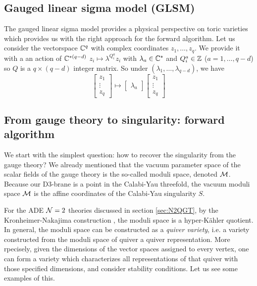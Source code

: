     \subsection{Gauged linear sigma model (GLSM)}

        The gauged linear sigma model provides a physical perspective on toric varieties which provides us with the right approach for the forward algorithm. Let us consider the vectorspace $\mathbb{C}^q$ with complex coordinates $z_1,\dots,z_q$. We provide it with a an action of $\mathbb{C}^{*(q-d)}$ $z_i\mapsto\lambda^{Q^a_i}z_i$ with $\lambda_a\in\mathbb{C}^*$ and $Q^a_i\in\mathbb{Z}$ ($a=1,\dots,q-d$) so $Q$ is a $q\times(q-d)$ integer matrix. So under $(\lambda_1,\dots,\lambda_{q-d})$, we have
        \begin{equation}
            \begin{bmatrix}
                z_1\\
                \vdots\\
                z_q
            \end{bmatrix}
            \mapsto
            \begin{bmatrix}
                \lambda_a
            \end{bmatrix}
            \begin{bmatrix}
                z_1\\
                \vdots\\
                z_q
            \end{bmatrix}
        \end{equation}

    \subsection{From gauge theory to singularity: forward algorithm}

        We start with the simplest question: how to recover the singularity from the gauge theory? We already mentioned that the vacuum parameter space of the scalar fields of the gauge theory is the so-called moduli space, denoted $\mathcal{M}$. Because our D$3$-brane is a point in the Calabi-Yau threefold, the vacuum moduli space $\mathcal{M}$ is the affine coordinates of the Calabi-Yau singularity $S$.

        For the ADE $\mathcal{N}=2$ theories discussed in section \ref{sec:N2QGT}, by the Kronheimer-Nakajima construction \cite{Kronheimer1990}, the moduli space is a hyper-Kähler quotient. In general, the moduli space can be constructed as a \emph{quiver variety}, i.e. a variety constructed from the moduli space of quiver a quiver representation. More rpecisely, given the dimensions of the vector spaces assigned to every vertex, one can form a variety which characterizes all representations of that quiver with those specified dimensions, and consider stability conditions. Let us see some examples of this.

